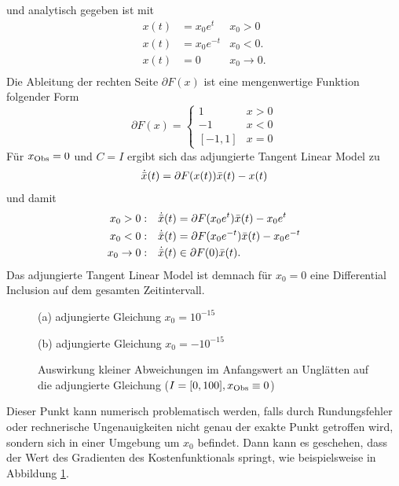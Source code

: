 und analytisch gegeben ist mit 
\[
 \begin{aligned}
  x(t) &= x_0 e^t &x_0>0\\
  x(t) &= x_0 e^{-t} &x_0<0.\\
  x(t) &= 0 &x_0\to 0.\\
 \end{aligned}
\]
Die Ableitung der rechten Seite $\partial F(x)$ ist eine mengenwertige Funktion folgender Form
\[
\partial F(x) = \begin{cases}
          1 & x>0\\
         -1 &x<0\\
          [-1,1] & x=0
         \end{cases}
\]
Für $x_{\text{Obs}} = 0$ und $C=I$ ergibt sich das adjungierte Tangent Linear Model zu
\[
 \begin{aligned}
  \dot {\bar{x}}(t)  &= \partial F(x(t)) \bar{x}(t) - x(t) \\ 
 \end{aligned}
\]
und damit 
\[
 \begin{aligned}
  x_0>0: &&  \dot {\bar{x}}(t)  &= \partial F(x_0e^t) \bar{x}(t) - x_0e^t \\ 
  x_0<0: &&  \dot {\bar{x}}(t)  &= \partial F(x_0e^{-t}) \bar{x}(t) - x_0e^{-t} \\ 
  x_0\to 0:&& \dot {\bar{x}}(t)  &\in \partial F(0) \bar{x}(t). \\ 
 \end{aligned}
\]
Das adjungierte Tangent Linear Model ist demnach für $x_0=0$ eine Differential Inclusion auf dem gesamten Zeitintervall.

\begin{figure}[ht]
\footnotesize
\centering
\begin{minipage}[b]{0.49\linewidth}
\centering

\caption*{(a) adjungierte Gleichung $x_0=10^{-15}$}
\end{minipage}
\begin{minipage}[b]{0.49\linewidth}
\centering

\caption*{(b) adjungierte Gleichung $x_0=-10^{-15}$}
\end{minipage}
\caption{Auswirkung kleiner Abweichungen im Anfangswert an Unglätten auf die adjungierte Gleichung ($I=[0,100], x_{\text{Obs}} \equiv 0$)}
\label{fig:babyExampleAdjEq}
\end{figure}

Dieser Punkt kann numerisch problematisch werden, falls durch Rundungsfehler oder rechnerische Ungenauigkeiten nicht genau der exakte Punkt getroffen wird, sondern sich in einer Umgebung um $x_0$ befindet. Dann kann es geschehen, dass der Wert des Gradienten des Kostenfunktionals springt, wie beispielsweise in Abbildung \ref{fig:babyExampleAdjEq}.

